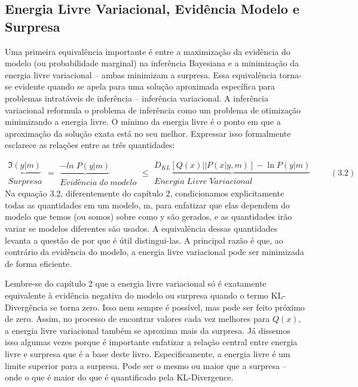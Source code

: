\documentclass[
  12pt,
]{book}
\begin{document}
\hypertarget{energia-livre-variacional-eviduxeancia-modelo-e-surpresa}{%
\subsection{Energia Livre Variacional, Evidência Modelo e Surpresa}\label{energia-livre-variacional-eviduxeancia-modelo-e-surpresa}}

Uma primeira equivalência importante é entre a maximização da evidência do modelo (ou probabilidade marginal) na inferência Bayesiana e a minimização da energia livre variacional -- ambas minimizam a surpresa. Essa equivalência torna-se evidente quando se apela para uma solução aproximada específica para problemas intratáveis de inferência -- inferência variacional. A inferência variacional reformula o problema de inferência como um problema de otimização minimizando a energia livre. O mínimo da energia livre é o ponto em que a aproximação da solução exata está no seu melhor. Expressar isso formalmente esclarece as relações entre as três quantidades:

\[\begin{matrix} \underbrace {ℑ(y|m)} \\ Surpresa \end{matrix} = \begin{matrix}\underbrace{-ln\;P(y|m)} \\ Evidência\; do \; modelo\end{matrix} \le \begin{matrix} \underbrace{D_{KL}[Q(x)||P(x|y,m)]- \ln P(y|m)} \\ Energia \; Livre\; Variacional \end{matrix} \qquad (3.2)\]
Na equação 3.2, diferentemente do capítulo 2, condicionamos explicitamente todas as quantidades em um modelo, m, para enfatizar que elas dependem do modelo que temos (ou somos) sobre como y são gerados, e as quantidades irão variar se modelos diferentes são usados. A equivalência dessas quantidades levanta a questão de por que é útil distingui-las. A principal razão é que, ao contrário da evidência do modelo, a energia livre variacional pode ser minimizada de forma eficiente.

Lembre-se do capítulo 2 que a energia livre variacional só é exatamente equivalente à evidência negativa do modelo ou surpresa quando o termo KL-Divergência se torna zero. Isso nem sempre é possível, mas pode ser feito próximo de zero. Assim, no processo de encontrar valores cada vez melhores para \(Q(x)\), a energia livre variacional também se aproxima mais da surpresa. Já dissemos isso algumas vezes porque é importante enfatizar a relação central entre energia livre e surpresa que é a base deste livro. Especificamente, a energia livre é um limite superior para a surpresa. Pode ser o mesmo ou maior que a surpresa -- onde o que é maior do que é quantificado pela KL-Divergence.
\end{document}
